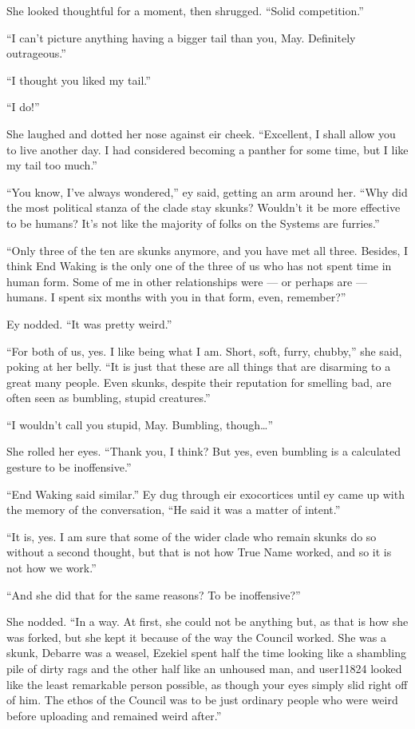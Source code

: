 She looked thoughtful for a moment, then shrugged. ``Solid competition.''

``I can't picture anything having a bigger tail than you, May. Definitely outrageous.''

``I thought you liked my tail.''

``I do!''

She laughed and dotted her nose against eir cheek. ``Excellent, I shall allow you to live another day. I had considered becoming a panther for some time, but I like my tail too much.''

``You know, I've always wondered,'' ey said, getting an arm around her. ``Why did the most political stanza of the clade stay skunks? Wouldn't it be more effective to be humans? It's not like the majority of folks on the Systems are furries.''

``Only three of the ten are skunks anymore, and you have met all three. Besides, I think End Waking is the only one of the three of us who has not spent time in human form. Some of me in other relationships were — or perhaps are — humans. I spent six months with you in that form, even, remember?''

Ey nodded. ``It was pretty weird.''

``For both of us, yes. I like being what I am. Short, soft, furry, chubby,'' she said, poking at her belly. ``It is just that these are all things that are disarming to a great many people. Even skunks, despite their reputation for smelling bad, are often seen as bumbling, stupid creatures.''

``I wouldn't call you stupid, May. Bumbling, though\ldots{}''

She rolled her eyes. ``Thank you, I think? But yes, even bumbling is a calculated gesture to be inoffensive.''

``End Waking said similar.'' Ey dug through eir exocortices until ey came up with the memory of the conversation, ``He said it was a matter of intent.''

``It is, yes. I am sure that some of the wider clade who remain skunks do so without a second thought, but that is not how True Name worked, and so it is not how we work.''

``And she did that for the same reasons? To be inoffensive?''

She nodded. ``In a way. At first, she could not be anything but, as that is how she was forked, but she kept it because of the way the Council worked. She was a skunk, Debarre was a weasel, Ezekiel spent half the time looking like a shambling pile of dirty rags and the other half like an unhoused man, and user11824 looked like the least remarkable person possible, as though your eyes simply slid right off of him. The ethos of the Council was to be just ordinary people who were weird before uploading and remained weird after.''

